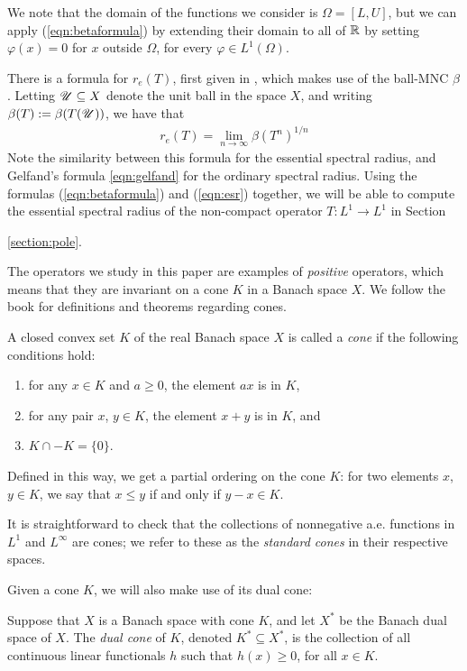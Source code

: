 We note that the domain of the functions we consider is $\Omega = [L,U]$, but we can apply (\ref{eqn:betaformula}) by extending their domain to all of $\mathbb{R}$ by setting $\varphi(x) = 0$ for $x$ outside $\Omega$, for every $\varphi \in L^1(\Omega)$.

There is a formula for $r_e(T)$, first given in \cite{Nussbaum1970}, which makes use of the ball-MNC $\beta$. Letting $\mathscr U \subseteq X$ denote the unit ball in the space $X$, and writing $\beta(T) := \beta(T(\mathscr U))$, we have that
\begin{align}
	r_e(T) = \lim_{n \to \infty} \beta(T^n)^{1/n} \label{eqn:esr}
\end{align}
Note the similarity between this formula for the essential spectral radius, and Gelfand's formula \eqref{eqn:gelfand} for the ordinary spectral radius. Using the formulas (\ref{eqn:betaformula}) and (\ref{eqn:esr}) together, we will be able to compute the essential spectral radius of the non-compact operator $T:L^1 \to L^1$ in Section {\ref{section:pole}.

The operators we study in this paper are examples of \emph{positive} operators, which means that they are invariant on a cone $K$ in a Banach space $X$. We follow the book \cite{Kras1989} for definitions and theorems regarding cones.
	\begin{definition}
		A closed convex set $K$ of the real Banach space $X$ is called a \emph{cone} if the following conditions hold:
		\begin{enumerate}
			\item for any $x \in K$ and $a \geq 0$, the element $ax$ is in $K$,
			\item for any pair $x$, $y \in K$, the element $x +y$ is in $K$, and 
			\item $K \cap -K = \{0\}$.
		\end{enumerate}
	\end{definition}
	
	Defined in this way, we get a partial ordering on the cone $K$: for two elements $x$, $y \in K$, we say that $x \leq y$ if and only if $y-x \in K$. 
	
	It is straightforward to check that the collections of nonnegative a.e. functions in $L^1$ and $L^\infty$ are cones; we refer to these as the \emph{standard cones} in their respective spaces.
	
	Given a cone $K$, we will also make use of its dual cone:
	
	\begin{definition}
		Suppose that $X$ is a Banach space with cone $K$, and let $X^*$ be the Banach dual space of $X$. The \emph{dual cone} of $K$, denoted $K^* \subseteq X^*$, is the collection of all continuous linear functionals $h$ such that $h(x) \geq 0$, for all $x \in K$.
	\end{definition}
	
}

